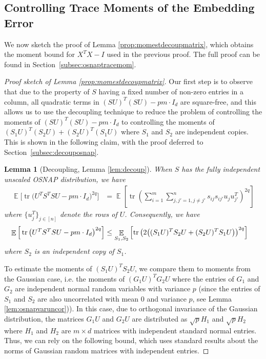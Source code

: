 \documentclass[11pt]{amsart}
\numberwithin{equation}{section}
\numberwithin{equation}{section}
\DeclareMathOperator{\E}{\mathbb{E}}
\DeclareMathOperator*{\tr}{tr}
\DeclarePairedDelimiter{\paren}{(}{)}
\newtheorem*{lemmanon}{Lemma}
\theoremstyle{remark}
\theoremstyle{definition}
\begin{document}
\subsection{Controlling Trace Moments of the Embedding Error}

We now sketch the proof of Lemma \ref{prop:momestdecoupmatrix}, which obtains the moment bound for $X^TX-I$ used in the previous proof. The full proof can be found in Section~\ref{subsec:osnaptracemom}. 

\begin{proof}[Proof sketch of Lemma \ref{prop:momestdecoupmatrix}]
    Our first step is to observe that due to the property of $S$ having a fixed number of non-zero entries in a column, all quadratic terms in $(SU)^T(SU) - pm\cdot I_d$ are square-free, and this allows us to use the decoupling technique to reduce the problem of controlling the moments of $(SU)^T(SU) - pm\cdot I_d$ to controlling the moments of $(S_1U)^T(S_2U) + (S_2U)^T(S_1U)$ where $S_1$ and $S_2$ are independent copies. This is shown in the following claim, with the proof deferred to Section~\ref{subsec:decouposnap}.
\begin{lemmanon}[Decoupling, Lemma \ref{lem:decoup}] 
When $S$ has the fully independent unscaled OSNAP distribution, we have
\begin{align*}
    \E \Big[ \tr \big(U^TS^TSU - pm\cdot I_d\big)^{2q} \Big] &= \E \left[ \tr \left( \sum_{i=1}^m \sum_{j,j' =1, j \neq j'}^n s_{ij}s_{ij'} u_ju_{j'}^T \right)^{2q} \right]
\end{align*}
where $\{ u_j^T \}_{j \in [n]}$ denote the rows of $U$.
Consequently, we have
\begin{align*}
    \E \Big[ \tr \big(U^TS^TSU - pm\cdot I_d\big)^{2q} \Big] &\le \E_{S_1,S_2} \left[ \tr \left(  2\paren*{(S_1U)^TS_2U + (S_2U)^TS_1U} \right)^{2q} \right]
\end{align*}
where $S_2$ is an independent copy of $S_1$.
\end{lemmanon}

To estimate the moments of $(S_1U)^TS_2U$, we compare them to moments from the Gaussian case, i.e. the moments of $(G_1U)^TG_2U$ where the entries of $G_1$ and $G_2$ are independent normal random variables with variance $p$ (since the entries of $S_1$ and $S_2$ are also uncorrelated with mean 0 and variance $p$, see Lemma \ref{lem:osnapvaruncor})). In this case, due to orthogonal invariance of the Gaussian distribution, the matrices $G_1U$ and $G_2U$ are distributed as $\sqrt{p}H_1$ and $\sqrt{p}H_2$ where $H_1$ and $H_2$ are $m \times d$ matrices with independent standard normal entries. Thus, we can rely on the following bound, which uses standard results about the norms of Gaussian random matrices with independent entries. 


\end{proof}
\end{document}
